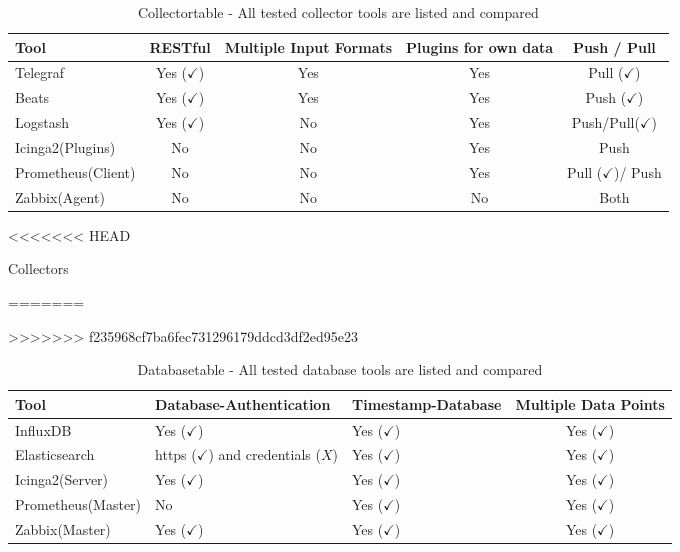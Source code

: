 \begin{table}
\centering
\begin{tabular}{p{3cm}cccc}
\hline
Tool & RESTful & Multiple Input Formats      & Plugins for own data        & Push / Pull \\
\hline
Telegraf    & Yes ($ \checkmark $) & Yes    & Yes    &Pull    ($ \checkmark $)  \\
Beats  & Yes ($ \checkmark $)  & Yes & Yes  & Push ($ \checkmark $) \\
Logstash & Yes ($ \checkmark $)  & No & Yes & Push/Pull($\checkmark$)                         \\
Icinga2(Plugins)  & No  & No  & Yes  & Push \\
Prometheus(Client)  & No  & No  & Yes  & Pull ($ \checkmark $)/ Push\\
Zabbix(Agent) & No  & No  & No  & Both \\
\hline                        
\end{tabular}
<<<<<<< HEAD
\caption{Collectors}
\label{tab:Collector}

=======
\caption{Collectortable - All tested collector tools are listed and compared}
\label{tab:Collector}
>>>>>>> f235968cf7ba6fec731296179ddcd3df2ed95e23
\end{table}


\begin{table}
\centering

\begin{tabular}{p{3cm}p{3cm}p{3cm}c}
	\hline
Tool & Database-Authentication     & Timestamp-Database          & Multiple Data Points        \\
\hline
InfluxDB  & Yes ($ \checkmark $) & Yes ($ \checkmark $)  & Yes ($ \checkmark $)\\
Elasticsearch & https ($ \checkmark $) and credentials ($ X $) & Yes ($ \checkmark $) & Yes ($ \checkmark $)\\
Icinga2(Server) & Yes ($ \checkmark $) & Yes ($ \checkmark $) & Yes ($ \checkmark $) \\
Prometheus(Master)& No & Yes ($ \checkmark $) & Yes ($ \checkmark $)\\
Zabbix(Master)& Yes ($ \checkmark $) & Yes ($ \checkmark $) & Yes ($ \checkmark $)\\
\hline
\end{tabular}
\caption{Databasetable - All tested database tools are listed and compared}
\label{tab:Database}
\end{table}

